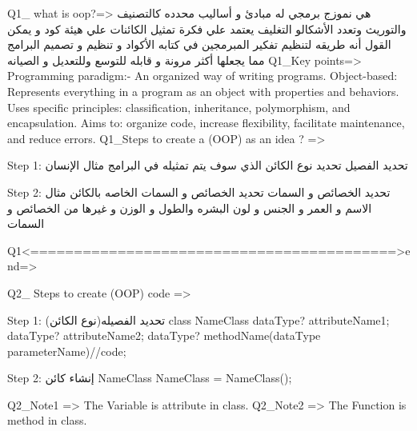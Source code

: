 Q1_ what is oop?=> 
هي نموزج برمجي له مبادئ و أساليب محدده كالتصنيف والتوريث وتعدد الأشكالو التغليف يعتمد علي فكرة تمثيل الكائنات علي هيئة كود و يمكن القول أنه طريقه لتنظيم تفكير المبرمجين في كتابه الأكواد و تنظيم و تصميم البرامج مما يجعلها أكثر مرونة و قابله للتوسع وللتعديل  و الصيانه
    Q1_Key points=> {
    Programming paradigm:- An organized way of writing programs.
    Object-based: Represents everything in a program as an object with properties and behaviors.
        Uses specific principles: classification, inheritance, polymorphism, and encapsulation.
    Aims to: organize code, increase flexibility, facilitate maintenance, and reduce errors.
    } 
    Q1_Steps to create a (OOP) as an idea ? => {
        Step 1: تحديد الفصيل
            تحديد نوع الكائن الذي سوف يتم تمثيله في البرامج مثال الإنسان
                        
        Step 2: تحديد الخصائص و السمات
            تحديد الخصائص و السمات الخاصه بالكائن مثال الاسم و العمر و الجنس و لون البشره والطول و الوزن و غيرها من الخصائص و السمات
    }
                     Q1<==========================================>end=>

Q2_ Steps to create (OOP) code => {
    Step 1: (نوع الكائن)تحديد الفصيله
         class NameClass{
             dataType? attributeName1;
             dataType? attributeName2;
             dataType? methodName(dataType parameterName){//code;}
         }
   
       Step 2:  إنشاء كائن 
         NameClass NameClass = NameClass();
   
       Q2_Note1 => The Variable is attribute in class.
       Q2_Note2 => The Function is method in class.
}

